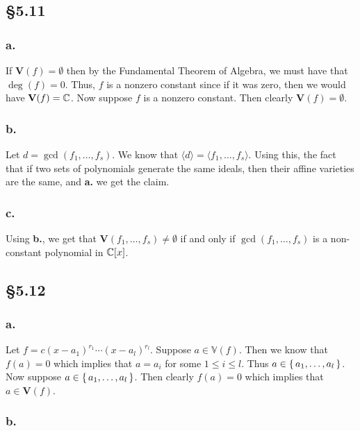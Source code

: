 \documentclass[letterpaper]{article}
\begin{document}
\subsection*{\S 5.11}

\subsubsection*{a.}

If $\textbf{V}(f) = \emptyset$ then by the Fundamental Theorem of Algebra, we must have that $\deg(f) = 0$. Thus, $f$ is a nonzero constant since if it was zero, then we would have $\textbf{V}(f) = \mathbb{C}$. Now suppose $f$ is a nonzero constant. Then clearly $\textbf{V}(f) = \emptyset$.

\subsubsection*{b.}

Let $d = \gcd(f_{1}, \ldots, f_{s})$. We know that $\langle d \rangle = \langle f_{1}, \ldots, f_{s} \rangle$. Using this, the fact that if two sets of polynomials generate the same ideals, then their affine varieties are the same, and \textbf{a.} we get the claim.

\subsubsection*{c.}

Using \textbf{b.}, we get that $\textbf{V}(f_{1}, \ldots, f_{s}) \neq \emptyset$ if and only if $\gcd(f_{1}, \ldots, f_{s})$ is a non-constant polynomial in $\mathbb{C}[x]$.

\subsection*{\S 5.12}


\subsubsection*{a.}

Let $f = c(x - a_{1})^{r_{1}} \cdots (x - a_{l})^{r_{l}}$. Suppose $a \in \mathbb{V}(f)$. Then we know that $f(a) = 0$ which implies that $a = a_{i}$ for some $1 \leq i \leq l$. Thus $a \in \set{a_{1}, \ldots, a_{l}}$. Now suppose $a \in \set{a_{1}, \ldots, a_{l}}$. Then clearly $f(a) = 0$ which implies that $a \in \textbf{V}(f)$.

\subsubsection*{b.}
\end{document}
